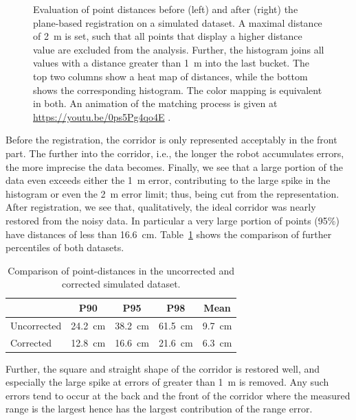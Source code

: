 \begin{figure}
\begin{minipage}[c]{0.495\textwidth}
  	\end{minipage} 	
 	\caption{Evaluation of point distances before (left) and after (right) the plane-based registration on a simulated dataset. A maximal distance of \SI{2}{m} is set, such that all points that display a higher distance value are excluded from the analysis. Further, the histogram joins all values with a distance greater than \SI{1}{m} into the last bucket. The top two columns show a heat map of distances, while the bottom shows the corresponding histogram. The color mapping is equivalent in both. An animation of the matching process is given at \url{https://youtu.be/0ps5Pg4qo4E} .}
 	\label{fig:simulatedEvaluation}
\end{figure} 

Before the registration, the corridor is only represented acceptably in the front part. 
The further into the corridor, i.e., the longer the robot accumulates errors, the more imprecise the data becomes. 
Finally, we see that a large portion of the data even exceeds either the \SI{1}{\meter} error, contributing to the large spike in the histogram or even the \SI{2}{\meter} error limit; thus, being cut from the representation. 
After registration, we see that, qualitatively, the ideal corridor was nearly restored from the noisy data. 
In particular a very large portion of points (95\%) have distances of less than \SI{16.6}{\centi\meter}.
Table~\ref{tab:percentiles} shows the comparison of further percentiles of both datasets. 

\begin{table}
	\centering
	\begin{tabular}{@{}lcccc@{}}\hline
		& P90 & P95 & P98 & Mean\\ \hline\hline
		Uncorrected & \SI{24.2}{\centi\meter} &  \SI{38.2}{\centi\meter} &  \SI{61.5}{\centi\meter} & \SI{9.7}{\centi\meter}\\
		Corrected & \SI{12.8}{\centi\meter} &  \SI{16.6}{\centi\meter} &  \SI{21.6}{\centi\meter} & \SI{6.3}{\centi\meter}\\ \hline
	\end{tabular}
	\caption{Comparison of point-distances in the uncorrected and corrected simulated dataset.}
	\label{tab:percentiles}
\end{table}

Further, the square and straight shape of the corridor is restored well, and especially the large spike at errors of greater than \SI{1}{m} is removed. 
Any such errors tend to occur at the back and the front of the corridor where the measured range is the largest hence has the largest contribution of the range error. 

